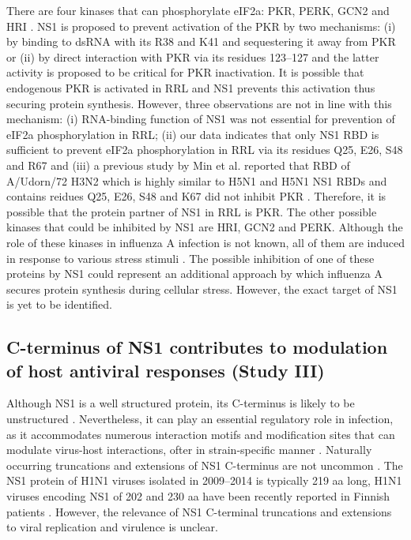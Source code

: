 		There are four kinases that can phosphorylate \gls{eIF2a}: \gls{PKR}, \gls{PERK}, \gls{GCN2} and \gls{HRI} \parencite{Donnelly2013}. NS1 is proposed to prevent activation of the \gls{PKR} by two mechanisms: (i) by binding to dsRNA with its R38 and K41 and sequestering it away from \gls{PKR} \parencite{Lu1995} or (ii) by direct interaction with \gls{PKR} via its residues 123--127 \parencite{Min2007} and the latter activity is proposed to be critical for \gls{PKR} inactivation. It is possible that endogenous \gls{PKR} is activated in \gls{RRL} and \gls{NS1} prevents this activation thus securing protein synthesis. However, three observations are not in line with this mechanism: (i) RNA-binding function of NS1 was not essential for prevention of \gls{eIF2a} phosphorylation in \gls{RRL}; (ii) our data indicates that only \gls{NS1} \gls{RBD} is sufficient to prevent \gls{eIF2a} phosphorylation in RRL via its residues Q25, E26, S48 and R67 and (iii) a previous study by Min et al. reported that \gls{RBD} of A/Udorn/72 H3N2 which is highly similar to H5N1 and H5N1 NS1 \glspl{RBD} and contains reidues Q25, E26, S48 and K67 did not inhibit \gls{PKR} \parencite{Min2007}. Therefore, it is possible that the protein partner of NS1 in \gls{RRL} is \gls{PKR}. The other possible kinases that could be inhibited by \gls{NS1} are \gls{HRI}, \gls{GCN2} and \gls{PERK}. Although the role of these kinases in influenza A infection is not known,  all of them are induced in response to various stress stimuli \parencite{Donnelly2013}. The possible inhibition of one of these proteins by \gls{NS1} could represent an additional approach by which influenza A secures protein synthesis during cellular stress. However, the exact target of NS1 is yet to be identified. 

		
	\subsection{C-terminus of NS1 contributes to modulation of host antiviral responses (Study III)}
		
		Although NS1 is a well structured protein, its C-terminus is likely to be unstructured \parencite{Hale2008b}. Nevertheless, it can play an essential regulatory role in infection, as it accommodates numerous interaction motifs and modification sites that can modulate virus-host interactions, ofter in strain-specific manner \parencite{Liu2010, Marazzi2012, Li2001, Melen2012, Hsiang2012, Hsiang2009}. Naturally occurring truncations and extensions of NS1 C-terminus are not uncommon \parencite{Suarez1998}. The NS1 protein of H1N1 viruses isolated in 2009--2014 is typically 219 aa long, H1N1 viruses encoding NS1 of 202 and 230 aa have been recently reported in Finnish patients \parencite{Lakspere2014}. However, the relevance of NS1 C-terminal truncations and extensions to viral replication and virulence is unclear.
		

